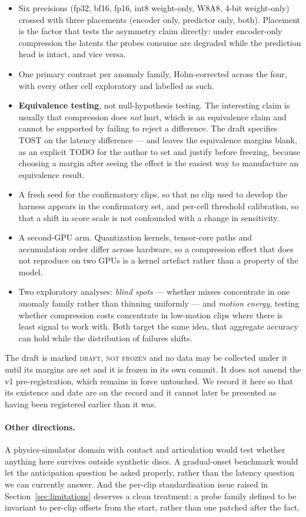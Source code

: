 \begin{itemize}
\item Six precisions (fp32, bf16, fp16, int8 weight-only, W8A8, 4-bit
weight-only) crossed with three placements (encoder only, predictor only,
both). Placement is the factor that tests the asymmetry claim directly: under
encoder-only compression the latents the probes consume are degraded while the
prediction head is intact, and vice versa.
\item One primary contrast per anomaly family, Holm-corrected across the four,
with every other cell exploratory and labelled as such.
\item \textbf{Equivalence testing}, not null-hypothesis testing. The interesting
claim is usually that compression does \emph{not} hurt, which is an equivalence
claim and cannot be supported by failing to reject a difference. The draft
specifies TOST on the latency difference --- and leaves the equivalence margins
blank, as an explicit TODO for the author to set and justify before freezing,
because choosing a margin after seeing the effect is the easiest way to
manufacture an equivalence result.
\item A fresh seed for the confirmatory clips, so that no clip used to develop
the harness appears in the confirmatory set, and per-cell threshold calibration,
so that a shift in score scale is not confounded with a change in sensitivity.
\item A second-GPU arm. Quantization kernels, tensor-core paths and accumulation
order differ across hardware, so a compression effect that does not reproduce on
two GPUs is a kernel artefact rather than a property of the model.
\item Two exploratory analyses: \emph{blind spots} --- whether misses
concentrate in one anomaly family rather than thinning uniformly --- and
\emph{motion energy}, testing whether compression costs concentrate in
low-motion clips where there is least signal to work with. Both target the same
idea, that aggregate accuracy can hold while the distribution of failures
shifts.
\end{itemize}

The draft is marked \textsc{draft, not frozen} and no data may be collected
under it until its margins are set and it is frozen in its own commit. It does
not amend the v1 pre-registration, which remains in force untouched. We record
it here so that its existence and date are on the record and it cannot later be
presented as having been registered earlier than it was.

\paragraph{Other directions.}
A physics-simulator domain with contact and articulation would test whether
anything here survives outside synthetic discs. A gradual-onset benchmark would
let the anticipation question be asked properly, rather than the latency
question we can currently answer. And the per-clip standardisation issue raised
in Section~\ref{sec:limitations} deserves a clean treatment: a probe family
defined to be invariant to per-clip offsets from the start, rather than one
patched after the fact.
